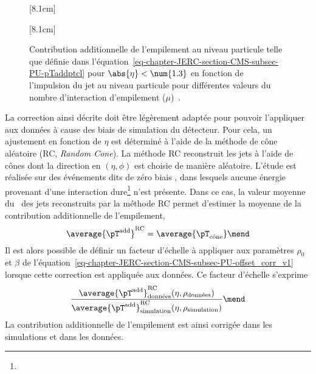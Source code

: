 \begin{figure}[h]
\centering
{}[8.1cm]
{}
\hfill
{}[8.1cm]
{}
\caption{Contribution additionnelle de l'empilement au niveau particule telle que définie dans l'équation~\eqref{eq-chapter-JERC-section-CMS-subsec-PU-pTaddptcl} pour $\abs{\eta}<\num{1.3}$ en fonction de l'impulsion du jet au niveau particule pour différentes valeurs du nombre d'interaction d'empilement ($\mu$)~\cite{JERC_RunI}.}
\label{fig-chapter-JERC-section-CMS-subsec-PU-JERC_RunI-Figure_005}
\end{figure}
\par La correction ainsi décrite doit être légèrement adaptée pour pouvoir l'appliquer aux données à cause des biais de simulation du détecteur.
Pour cela, un ajustement en fonction de $\eta$ est déterminé à l'aide de la méthode de cône aléatoire (RC, \emph {Random Cone}). La méthode RC reconstruit les jets à l'aide de cônes dont la direction en $(\eta, \phi)$ est choisie de manière aléatoire.
L'étude est réalisée sur des événements dits de \og zéro biais \fg, dans lesquels aucune énergie provenant d'une interaction dure\footnote{} n'est présente.
Dans ce cas, la valeur moyenne du \pT\ des jets reconstruits par la méthode RC permet d'estimer la moyenne de la contribution additionnelle de l'empilement, \ie
\begin{equation}
\average{\pT^\text{add}}^\text{RC} = \average{\pT_\text{cône}}
\mend
\end{equation}
Il est alors possible de définir un facteur d'échelle à appliquer aux paramètres $\rho_0$ et $\beta$ de l'équation~\eqref{eq-chapter-JERC-section-CMS-subsec-PU-offset_corr_v1} lorsque cette correction est appliquée aux données. Ce facteur d'échelle s'exprime
\begin{equation}
\frac{\average{\pT^\text{add}}^\text{RC}_\text{données}(\eta, \rho_\text{données})}{\average{\pT^\text{add}}^\text{RC}_\text{simulation}(\eta, \rho_\text{simulation})}
\mend
\end{equation}
La contribution additionnelle de l'empilement est ainsi corrigée dans les simulations et dans les données.
